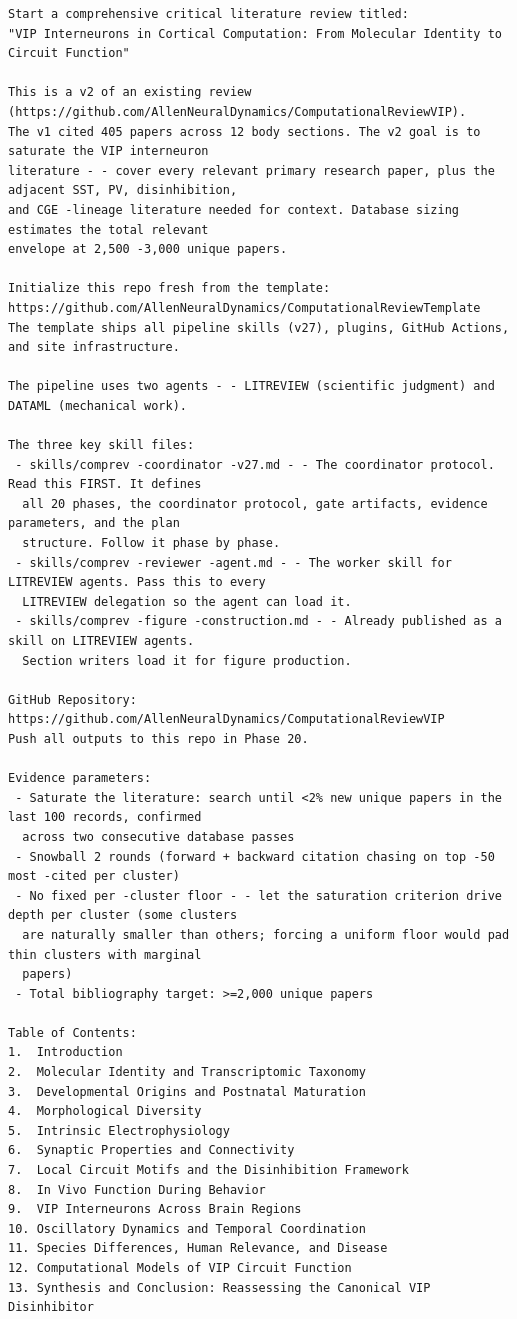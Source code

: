 \documentclass[11pt]{article}
\begin{document}
\begin{verbatim}
Start a comprehensive critical literature review titled:
"VIP Interneurons in Cortical Computation: From Molecular Identity to Circuit Function"

This is a v2 of an existing review (https://github.com/AllenNeuralDynamics/ComputationalReviewVIP).
The v1 cited 405 papers across 12 body sections. The v2 goal is to saturate the VIP interneuron
literature - - cover every relevant primary research paper, plus the adjacent SST, PV, disinhibition,
and CGE -lineage literature needed for context. Database sizing estimates the total relevant
envelope at 2,500 -3,000 unique papers.

Initialize this repo fresh from the template:
https://github.com/AllenNeuralDynamics/ComputationalReviewTemplate
The template ships all pipeline skills (v27), plugins, GitHub Actions, and site infrastructure.

The pipeline uses two agents - - LITREVIEW (scientific judgment) and DATAML (mechanical work).

The three key skill files:
 - skills/comprev -coordinator -v27.md - - The coordinator protocol. Read this FIRST. It defines
  all 20 phases, the coordinator protocol, gate artifacts, evidence parameters, and the plan
  structure. Follow it phase by phase.
 - skills/comprev -reviewer -agent.md - - The worker skill for LITREVIEW agents. Pass this to every
  LITREVIEW delegation so the agent can load it.
 - skills/comprev -figure -construction.md - - Already published as a skill on LITREVIEW agents.
  Section writers load it for figure production.

GitHub Repository: https://github.com/AllenNeuralDynamics/ComputationalReviewVIP
Push all outputs to this repo in Phase 20.

Evidence parameters:
 - Saturate the literature: search until <2% new unique papers in the last 100 records, confirmed
  across two consecutive database passes
 - Snowball 2 rounds (forward + backward citation chasing on top -50 most -cited per cluster)
 - No fixed per -cluster floor - - let the saturation criterion drive depth per cluster (some clusters
  are naturally smaller than others; forcing a uniform floor would pad thin clusters with marginal
  papers)
 - Total bibliography target: >=2,000 unique papers

Table of Contents:
1.  Introduction
2.  Molecular Identity and Transcriptomic Taxonomy
3.  Developmental Origins and Postnatal Maturation
4.  Morphological Diversity
5.  Intrinsic Electrophysiology
6.  Synaptic Properties and Connectivity
7.  Local Circuit Motifs and the Disinhibition Framework
8.  In Vivo Function During Behavior
9.  VIP Interneurons Across Brain Regions
10. Oscillatory Dynamics and Temporal Coordination
11. Species Differences, Human Relevance, and Disease
12. Computational Models of VIP Circuit Function
13. Synthesis and Conclusion: Reassessing the Canonical VIP Disinhibitor
\end{verbatim}
\end{document}
